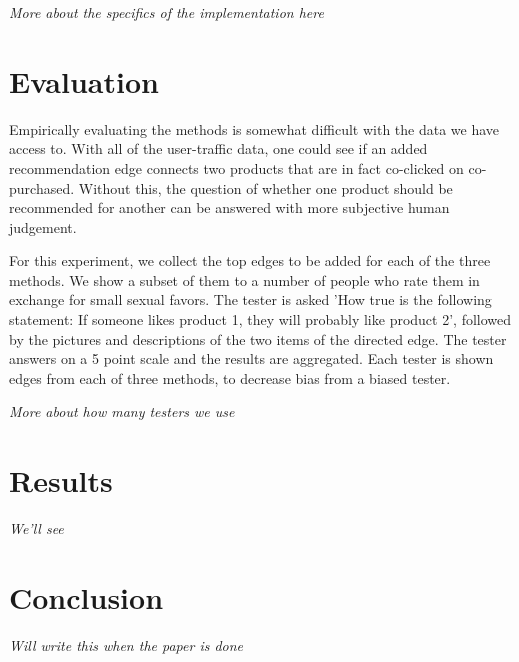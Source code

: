 \documentclass[10pt]{article}
\begin{document}
                \emph{More about the specifics of the implementation here}

                \section*{Evaluation}
                Empirically evaluating the methods is somewhat difficult with the data we
                have access to. With all of the user-traffic data, one could see if an added
                recommendation edge connects two products that are in fact co-clicked on
                co-purchased. Without this, the question of whether one product should be
                recommended for another can be answered with more subjective human
                judgement.

                For this experiment, we collect the top edges to be added for each of the
                three methods. We show a subset of them to a number of people who rate them
                in exchange for small sexual favors. The tester is asked 'How true is the
                following statement: If someone likes product 1, they will probably like
                product 2', followed by the pictures and descriptions of the two items of
                the directed edge. The tester answers on a 5 point scale and the results are
                aggregated. Each tester is shown edges from each of three methods, to
                decrease bias from a biased tester.

                \emph{More about how many testers we use}

                \section*{Results}
                \emph{We'll see}

                \section*{Conclusion}
                \emph{Will write this when the paper is done}

                
\end{document}
